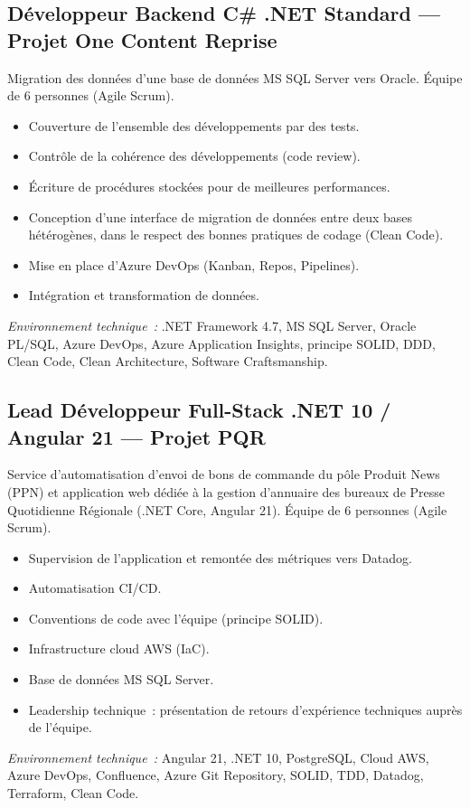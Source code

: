 \documentclass[10pt,a4paper]{article}
\begin{document}
\vspace{6pt}

\subsection*{Développeur Backend C\# .NET Standard --- Projet One Content Reprise}
\color{darkgray}
Migration des données d'une base de données MS SQL Server vers Oracle. Équipe de 6 personnes (Agile Scrum).
\begin{itemize}
  \item Couverture de l'ensemble des développements par des tests.
  \item Contrôle de la cohérence des développements (code review).
  \item Écriture de procédures stockées pour de meilleures performances.
  \item Conception d'une interface de migration de données entre deux bases hétérogènes, dans le respect des bonnes pratiques de codage (Clean Code).
  \item Mise en place d'Azure DevOps (Kanban, Repos, Pipelines).
  \item Intégration et transformation de données.
\end{itemize}
\textit{Environnement technique~:} .NET Framework 4.7, MS SQL Server, Oracle PL/SQL, Azure DevOps, Azure Application Insights, principe SOLID, DDD, Clean Code, Clean Architecture, Software Craftsmanship.

\vspace{6pt}

\subsection*{Lead Développeur Full-Stack .NET 10 / Angular 21 --- Projet PQR}
\color{darkgray}
Service d'automatisation d'envoi de bons de commande du pôle Produit News (PPN) et application web dédiée à la gestion d'annuaire des bureaux de Presse Quotidienne Régionale (.NET Core, Angular 21). Équipe de 6 personnes (Agile Scrum).
\begin{itemize}
  \item Supervision de l'application et remontée des métriques vers Datadog.
  \item Automatisation CI/CD.
  \item Conventions de code avec l'équipe (principe SOLID).
  \item Infrastructure cloud AWS (IaC).
  \item Base de données MS SQL Server.
  \item Leadership technique~: présentation de retours d'expérience techniques auprès de l'équipe.
\end{itemize}
\textit{Environnement technique~:} Angular 21, .NET 10, PostgreSQL, Cloud AWS, Azure DevOps, Confluence, Azure Git Repository, SOLID, TDD, Datadog, Terraform, Clean Code.
\end{document}
